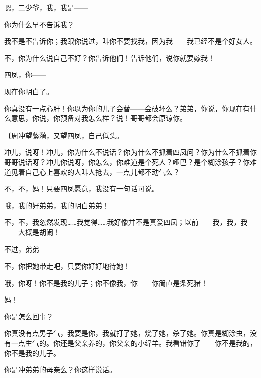 嗯，二少爷，我，我是——

你为什么早不告诉我？

我不是不告诉你；我跟你说过，叫你不要找我，因为我——我已经不是个好女人。

不，你为什么说自己不好？你告诉他们！告诉他们，说你就要嫁我！

四凤，你——

现在你明白了。

你真没有一点心肝！你以为你的儿子会替——会破坏么？弟弟，你说，你现在有什么意思，你说，你预备对我怎么样？说！哥哥都会原谅你。

{\fangsong〔周冲望蘩漪，又望四凤，自己低头。}

冲儿，说呀！冲儿，你为什么不说话？你为什么不抓着四凤问？你为什么不抓着你哥哥说话呀？冲儿你说呀，你怎么，你难道是个死人？哑巴？是个糊涂孩子？你难道见着自己心上喜欢的人叫人抢去，一点儿都不动气么？

不，不，妈！只要四凤愿意，我没有一句话可说。

哦，我的好弟弟，我的明白弟弟！

不，不，我忽然发现……我觉得……我好像并不是真爱四凤；以前——我，我，我——大概是胡闹！

不过，弟弟——

不，你把她带走吧，只要你好好地待她！

哦，你呀！你不是我的儿子；你不像我，你——你简直是条死猪！

妈！

你是怎么回事？

你真没有点男子气，我要是你，我就打了她，烧了她，杀了她。你真是糊涂虫，没有一点生气的。你还是父亲养的，你父亲的小绵羊。我看错你了——你不是我的，你不是我的儿子。

你是冲弟弟的母亲么？你这样说话。


